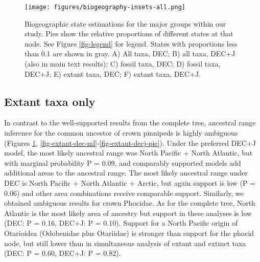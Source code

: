 \documentclass[a4paper, 12pt]{article}
\begin{document}
\begin{figure}[H]
 \centering
  \texttt{[image: figures/biogeography-insets-all.png]}
  \caption{Biogeographic state estimations for the major groups within our study. Pies show the relative proportions of different states at that node. See Figure \ref{fig-legend} for legend. States with proportions less than 0.1 are shown in gray. A) All taxa, DEC; B) all taxa, DEC+J (also in main text results); C) fossil taxa, DEC; D) fossil taxa, DEC+J; E) extant taxa, DEC; F) extant taxa, DEC+J.}
  \label{fig-nodes-all}
\end{figure} 

\subsection{Extant taxa only}
In contrast to the well-supported results from the complete tree, ancestral range inference for the common ancestor of crown pinnipeds is highly ambiguous (Figures \ref{fig-nodes-all}, \ref{fig-extant-dec-ml}-\ref{fig-extant-decj-pie}). Under the preferred DEC+J model, the most likely ancestral range was North Pacific + North Atlantic, but with marginal probability P = 0.09, and comparably supported models add additional areas to the ancestral range. The most likely ancestral range under DEC is North Pacific + North Atlantic + Arctic, but again support is low (P = 0.06) and other area combinations receive comparable support. Similarly, we obtained ambiguous results for crown Phocidae. As for the complete tree, North Atlantic is the most likely area of ancestry but support in these analyses is low (DEC: P = 0.16, DEC+J: P = 0.10). Support for a North Pacific origin of Otarioidea (Odobenidae plus Otariidae) is stronger than support for the phocid node, but still lower than in simultaneous analysis of extant and extinct taxa (DEC: P = 0.60, DEC+J: P = 0.82).
\end{document}

